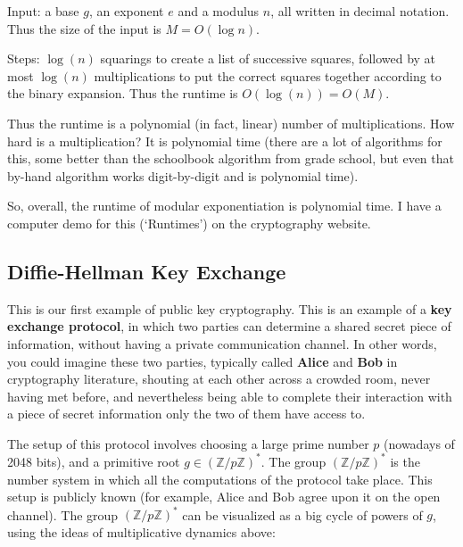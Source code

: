 \documentclass{article}
\theoremstyle{plain}
\theoremstyle{definition}
\theoremstyle{remark}
\numberwithin{theorem}{section}
\newcommand{\ZZ}{\mathbb{Z}}
\begin{document}
Input:  a base $g$, an exponent $e$ and a modulus $n$, all written in decimal notation.  Thus the size of the input is $M = O(\log n)$.

Steps:  $\log(n)$ squarings to create a list of successive squares, followed by at most $\log(n)$ multiplications to put the correct squares together according to the binary expansion.  Thus the runtime is $O(\log(n)) = O(M)$.

Thus the runtime is a polynomial (in fact, linear) number of multiplications.  How hard is a multiplication?  It is polynomial time (there are a lot of algorithms for this, some better than the schoolbook algorithm from grade school, but even that by-hand algorithm works digit-by-digit and is polynomial time).

So, overall, the runtime of modular exponentiation is polynomial time.  I have a computer demo for this (`Runtimes') on the cryptography website.

\subsection{Diffie-Hellman Key Exchange}

This is our first example of public key cryptography.  This is an example of a \textbf{key exchange protocol}, in which two parties can determine a shared secret piece of information, without having a private communication channel.  In other words, you could imagine these two parties, typically called \textbf{Alice} and \textbf{Bob} in cryptography literature, shouting at each other across a crowded room, never having met before, and nevertheless being able to complete their interaction with a piece of secret information only the two of them have access to.


The setup of this protocol involves choosing a large prime number $p$ (nowadays of 2048 bits), and a primitive root $g \in (\ZZ/p\ZZ)^*$.  The group $(\ZZ/p\ZZ)^*$ is the number system in which all the computations of the protocol take place.  This setup is publicly known (for example, Alice and Bob agree upon it on the open channel).  The group $(\ZZ/p\ZZ)^*$ can be visualized as a big cycle of powers of $g$, using the ideas of multiplicative dynamics above:
\end{document}
